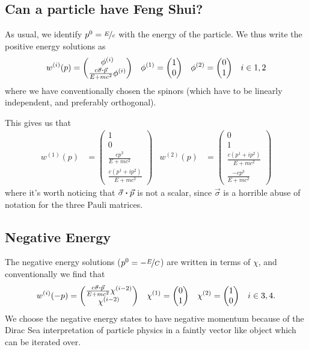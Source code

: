 \documentclass[]{revision-notes}
\begin{document}
\subsection{Can a particle have Feng Shui?}
As usual, we identify \(p^0 = \nicefrac{E}{c}\) with the energy of the particle.
We thus write the positive energy solutions as
\begin{align*}
  w^{(i)}(p) &= \mqty(\phi^{(i)}\\\frac{c \vec{\sigma}\vdot\vec{p} }{E + mc^2}\phi^{(i)}) & \phi^{(1)} &= \mqty(1\\0) & \phi^{(2)} &= \mqty(0\\1)&  i \in { 1, 2 }
\end{align*}
where we have conventionally chosen the spinors (which have to be linearly independent, and preferably orthogonal).

This gives us that
\begin{align*}
  w^{(1)}(p) &= \begin{pmatrix}
    1 \\ 0\\
    \frac{cp^3}{E+mc^2} \\ \frac{c(p^1 + i p^2)}{E+mc^2}
  \end{pmatrix} &
  w^{(2)}(p) &= \begin{pmatrix}
    0\\ 1\\
    \frac{c(p^1 + i p^2)}{E+mc^2} \\ \frac{-cp^3}{E+mc^2}
  \end{pmatrix}
\end{align*}
where it's worth noticing that \( \vec{\sigma}\vdot \vec{p} \) is not a scalar, since \(\vec{\sigma}\) is a horrible abuse of notation for the three Pauli matrices.

\subsection{Negative Energy}
The negative energy solutions (\(p^0 = - \nicefrac{E}{C}\)) are written in terms of \(\chi\), and conventionally we find that
\begin{align*}
  w^{(i)}(-p) &= \mqty(\frac{c \vec{\sigma}\vdot\vec{p} }{E + mc^2}\chi^{(i-2)}\\\chi^{(i-2)}) & \chi^{(1)} &= \mqty(0\\1) & \chi^{(2)} &= \mqty(1\\0) &  i \in { 3, 4 }.
\end{align*}
We choose the negative energy states to have negative momentum because of the Dirac Sea interpretation of particle physics in a faintly vector like object which can be iterated over.
\end{document}
